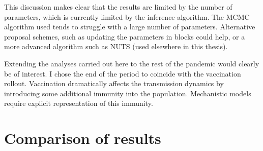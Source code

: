 \documentclass[thesis.tex]{subfiles}
\begin{document}
This discussion makes clear that the results are limited by the number of parameters, which is currently limited by the inference algorithm.
The MCMC algorithm used tends to struggle with a large number of parameters.
Alternative proposal schemes, such as updating the parameters in blocks could help, or a more advanced algorithm such as NUTS (used elsewhere in this thesis).

Extending the analyses carried out here to the rest of the pandemic would clearly be of interest.
I chose the end of the period to coincide with the vaccination rollout.
Vaccination dramatically affects the transmission dynamics by introducing some additional immunity into the population.
Mechanistic models require explicit representation of this immunity.

\section{Comparison of results} \label{transmission:sec:comparison}
\end{document}
